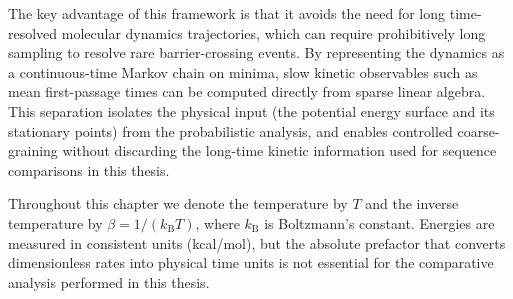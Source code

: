 The key advantage of this framework is that it avoids the need for long time-resolved
molecular dynamics trajectories, which can require prohibitively long sampling to
resolve rare barrier-crossing events. By representing the dynamics as a continuous-time
Markov chain on minima, slow kinetic observables such as mean first-passage times can
be computed directly from sparse linear algebra. This separation isolates the physical
input (the potential energy surface and its stationary points) from the probabilistic
analysis, and enables controlled coarse-graining without discarding the long-time
kinetic information used for sequence comparisons in this thesis.

Throughout this chapter we denote the temperature by $T$ and the
inverse temperature by $\beta = 1/(k_{\mathrm{B}}T)$, where
$k_{\mathrm{B}}$ is Boltzmann's constant. Energies are measured in
consistent units (kcal/mol), but the absolute prefactor that
converts dimensionless rates into physical time units is not essential
for the comparative analysis performed in this thesis.

